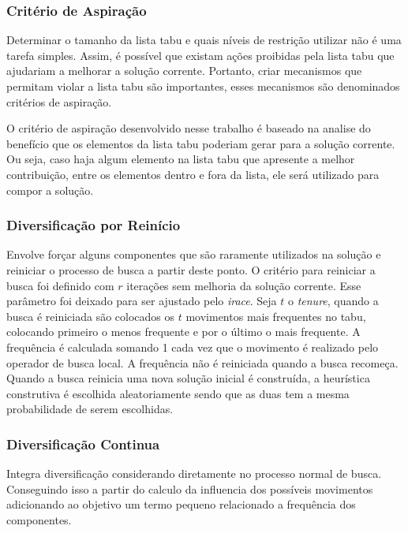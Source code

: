 \documentclass[12pt,a4paper]{article}
\begin{document}
    \subsubsection{Critério de Aspiração} 

        Determinar o tamanho da lista tabu e quais níveis de restrição utilizar não é uma tarefa simples. Assim, é possível que existam ações proibidas pela lista tabu que ajudariam a
        melhorar a solução corrente. Portanto, criar mecanismos que permitam violar a lista tabu são importantes, esses mecanismos são denominados critérios de aspiração. 

        O critério de aspiração desenvolvido nesse trabalho é baseado na analise do benefício que os elementos da lista tabu poderiam gerar para a solução corrente. Ou seja, caso haja algum elemento
        na lista tabu que apresente a melhor contribuição, entre os elementos dentro e fora da lista, ele será utilizado para compor a solução.

    \subsubsection{Diversificação por Reinício}

        Envolve forçar alguns componentes que são raramente utilizados na solução e reiniciar o processo de busca a partir deste ponto. O critério para reiniciar a busca foi definido com $r$
        iterações sem melhoria da solução corrente. Esse parâmetro foi deixado para ser ajustado pelo \textit{irace}. Seja $t$ o \textit{tenure}, quando a busca é reiniciada são colocados os $t$
        movimentos mais frequentes no tabu, colocando primeiro o menos frequente e por o último o mais frequente. A frequência é calculada somando 1 cada vez que o movimento é realizado pelo
        operador de busca local. A frequência não é reiniciada quando a busca recomeça. Quando a busca reinicia uma nova solução inicial é construída, a heurística construtiva é escolhida
        aleatoriamente sendo que as duas tem a mesma probabilidade de serem escolhidas. 

    \subsubsection{Diversificação Continua}

        Integra diversificação considerando diretamente no processo normal de busca. Conseguindo isso a partir do calculo da influencia dos possíveis movimentos adicionando ao objetivo um termo pequeno
        relacionado a frequência dos componentes.
\end{document}

